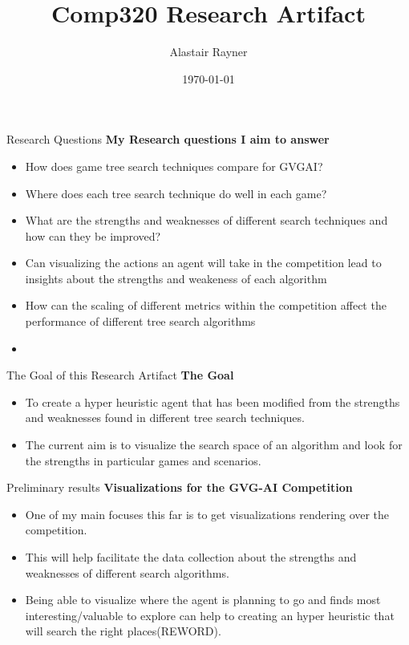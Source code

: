 \documentclass{beamer}
\title{Comp320 Research Artifact}
\author{Alastair Rayner}
\date{\today}
\begin{document}
\maketitle


\begin{frame}{Research Questions}
	\textbf{My Research questions I aim to answer}
	
	\begin{itemize}
    		\item How does game tree search techniques compare for GVGAI? \pause
    		\item Where does each tree search technique do well in each game? \pause 
    		\item What are the strengths and weaknesses of different search techniques and how can they be improved? \pause
	\end{itemize}
	
	\begin{itemize}
		\item Can visualizing the actions an agent will take in the competition lead to insights about the strengths and weakeness of each algorithm \pause
		\item How can the scaling of different metrics within the competition affect the performance of different tree search algorithms \pause
		\item 
	\end{itemize}
\end{frame}



\begin{frame}{The Goal of this Research Artifact}
		\textbf{The Goal} \pause
		\begin{itemize}
			\item To create a hyper heuristic agent that has been modified from the strengths and weaknesses found in different tree search techniques. \pause
			\item The current aim is to visualize the search space of an algorithm and look for the strengths in particular games and scenarios. \pause
		\end{itemize}
\end{frame}


\begin{frame}{Preliminary results}
\textbf{Visualizations for the GVG-AI Competition}
		\begin{itemize}
			\item One of my main focuses this far is to get visualizations rendering over the competition. \pause
			\item This will help facilitate the data collection about the strengths and weaknesses of different search algorithms. \pause
			\item Being able to visualize where the agent is planning to go and finds most interesting/valuable to explore can help to creating an hyper heuristic that will search the right places(REWORD).
		\end{itemize}
\end{frame}
\end{document}
